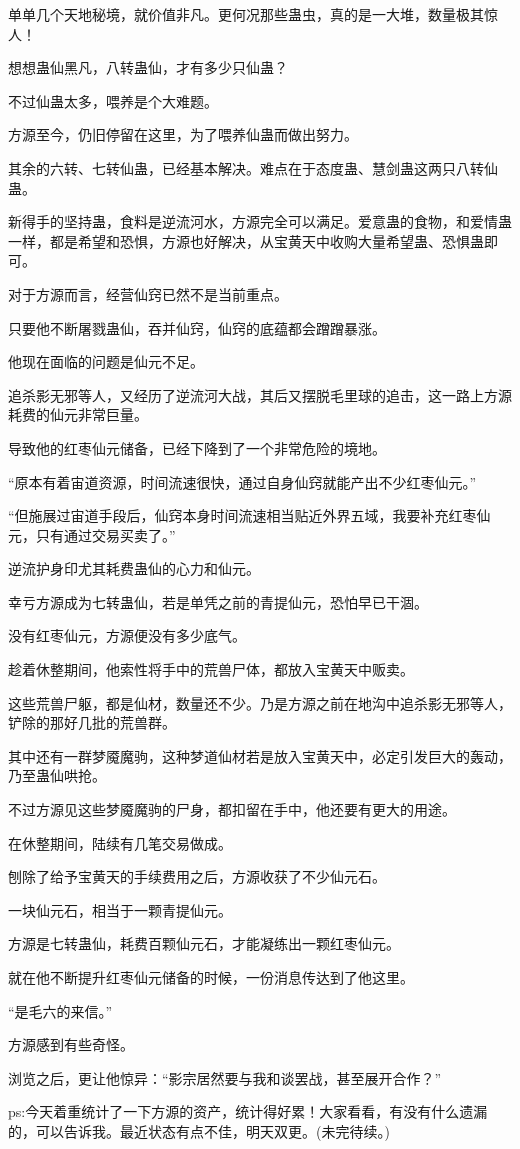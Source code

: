 \begin{this_body}
单单几个天地秘境，就价值非凡。更何况那些蛊虫，真的是一大堆，数量极其惊人！

想想蛊仙黑凡，八转蛊仙，才有多少只仙蛊？

不过仙蛊太多，喂养是个大难题。

方源至今，仍旧停留在这里，为了喂养仙蛊而做出努力。

其余的六转、七转仙蛊，已经基本解决。难点在于态度蛊、慧剑蛊这两只八转仙蛊。

新得手的坚持蛊，食料是逆流河水，方源完全可以满足。爱意蛊的食物，和爱情蛊一样，都是希望和恐惧，方源也好解决，从宝黄天中收购大量希望蛊、恐惧蛊即可。

对于方源而言，经营仙窍已然不是当前重点。

只要他不断屠戮蛊仙，吞并仙窍，仙窍的底蕴都会蹭蹭暴涨。

他现在面临的问题是仙元不足。

追杀影无邪等人，又经历了逆流河大战，其后又摆脱毛里球的追击，这一路上方源耗费的仙元非常巨量。

导致他的红枣仙元储备，已经下降到了一个非常危险的境地。

“原本有着宙道资源，时间流速很快，通过自身仙窍就能产出不少红枣仙元。”

“但施展过宙道手段后，仙窍本身时间流速相当贴近外界五域，我要补充红枣仙元，只有通过交易买卖了。”

逆流护身印尤其耗费蛊仙的心力和仙元。

幸亏方源成为七转蛊仙，若是单凭之前的青提仙元，恐怕早已干涸。

没有红枣仙元，方源便没有多少底气。

趁着休整期间，他索性将手中的荒兽尸体，都放入宝黄天中贩卖。

这些荒兽尸躯，都是仙材，数量还不少。乃是方源之前在地沟中追杀影无邪等人，铲除的那好几批的荒兽群。

其中还有一群梦魇魔驹，这种梦道仙材若是放入宝黄天中，必定引发巨大的轰动，乃至蛊仙哄抢。

不过方源见这些梦魇魔驹的尸身，都扣留在手中，他还要有更大的用途。

在休整期间，陆续有几笔交易做成。

刨除了给予宝黄天的手续费用之后，方源收获了不少仙元石。

一块仙元石，相当于一颗青提仙元。

方源是七转蛊仙，耗费百颗仙元石，才能凝练出一颗红枣仙元。

就在他不断提升红枣仙元储备的时候，一份消息传达到了他这里。

“是毛六的来信。”

方源感到有些奇怪。

浏览之后，更让他惊异：“影宗居然要与我和谈罢战，甚至展开合作？”

ps:今天着重统计了一下方源的资产，统计得好累！大家看看，有没有什么遗漏的，可以告诉我。最近状态有点不佳，明天双更。(未完待续。)

\end{this_body}

